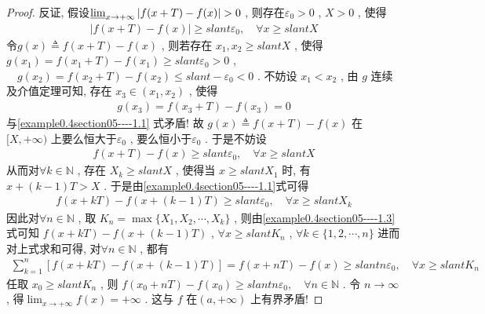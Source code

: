 \documentclass[../../main.tex]{subfiles}
\begin{document}
\begin{proof}
反证,
假设\(\varliminf_{x \to +\infty} \vert f(x + T) - f(x)\vert > 0\) , 则存在\(\varepsilon_0 > 0\) , \(X > 0\) , 使得
\begin{align}
\vert f(x + T) - f(x)\vert \geqslant slant \varepsilon_0,\quad \forall x \geqslant slant X \label{example0.4section05----1.1}
\end{align}
令\(g(x) \triangleq f(x + T) - f(x)\) , 则若存在 \(x_1, x_2 \geqslant slant X\) , 使得
\(g(x_1) = f(x_1 + T) - f(x_1) \geqslant slant \varepsilon_0 > 0\) , \(\quad g(x_2) = f(x_2 + T) - f(x_2) \leqslant slant -\varepsilon_0 < 0\) .
不妨设 \(x_1 < x_2\) , 由 \(g\) 连续及介值定理可知, 存在 \(x_3 \in (x_1, x_2)\) , 使得
\begin{align*}
g(x_3) = f(x_3 + T) - f(x_3) = 0
\end{align*}
与\eqref{example0.4section05----1.1} 式矛盾! 故 \(g(x) \triangleq f(x + T) - f(x)\) 在\([X, +\infty)\) 上要么恒大于\(\varepsilon_0\) , 要么恒小于\(\varepsilon_0\) . 于是不妨设
\begin{align}
f(x + T) - f(x) \geqslant slant \varepsilon_0,\quad \forall x \geqslant slant X \label{example0.4section05----1.2}
\end{align}
从而对\(\forall k \in \mathbb{N}\) , 存在 \(X_k \geqslant slant X\) , 使得当 \(x \geqslant slant X_1\) 时, 有
\(x + (k - 1)T > X\) .
于是由\eqref{example0.4section05----1.1}式可得
\begin{align}
f(x + kT) - f(x + (k - 1)T) \geqslant slant \varepsilon_0,\quad \forall x \geqslant slant X_k \label{example0.4section05----1.3}
\end{align}
因此对\(\forall n \in \mathbb{N}\) , 取 \(K_n = \max\{X_1, X_2, \cdots, X_k\}\) , 则由\eqref{example0.4section05----1.3}式可知
\(f(x + kT) - f(x + (k - 1)T)\) , \(\forall x \geqslant slant K_n\) , \(\forall k \in \{1, 2, \cdots, n\}\)
进而对上式求和可得, 对\(\forall n \in \mathbb{N}\) , 都有
\begin{align*}
\sum_{k = 1}^n [f(x + kT) - f(x + (k - 1)T)] = f(x + nT) - f(x) \geqslant slant n\varepsilon_0,\quad \forall x \geqslant slant K_n
\end{align*}
任取 \(x_0 \geqslant slant K_n\) , 则
\(f(x_0 + nT) - f(x_0) \geqslant slant n\varepsilon_0,\quad \forall n \in \mathbb{N}\) .
令 \(n \to \infty\) , 得\(\lim_{x \to +\infty} f(x) = +\infty\) . 这与 \(f\) 在\((a, +\infty)\) 上有界矛盾! 
\end{proof}
\end{document}
